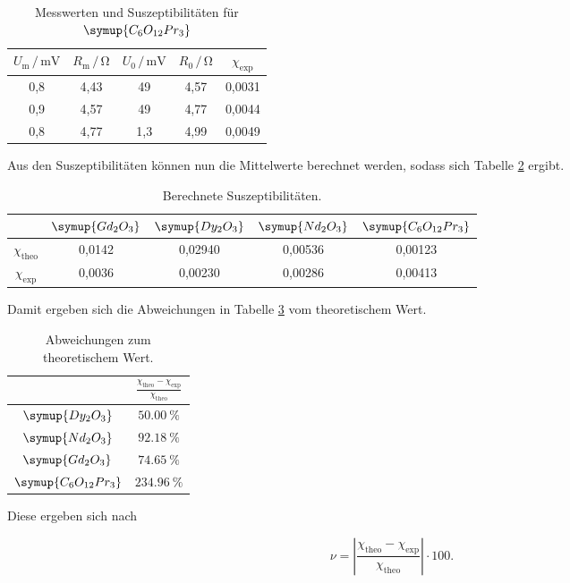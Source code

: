 \begin{table}
\centering
\caption{Messwerten und Suszeptibilitäten für $\symup{C_6O_{12}Pr_3}$}
\label{tab:Messdaten6}
\begin{tabular}{c c c c c}
\toprule
$U_\text{m} \,/\, \si{\milli\volt}$ & $R_\text{m} \,/\, \si{\ohm}$ & $U_\text{0} \,/\, \si{\milli\volt}$& $R_\text{0} \,/\, \si{\ohm}$ & $\chi _\text{exp}$ \\
\midrule
0,8 & 4,43 &  49 & 4,57 & 0,0031\\
0,9 & 4,57 &  49 & 4,77 & 0,0044\\
0,8 & 4,77 & 1,3 & 4,99 & 0,0049\\
\bottomrule
\end{tabular}
\end{table}

Aus den Suszeptibilitäten können nun die Mittelwerte berechnet werden, 
sodass sich Tabelle \ref{tab:Messdaten7} ergibt. 

\begin{table}
\centering
\caption{Berechnete Suszeptibilitäten.}
\label{tab:Messdaten7}
\begin{tabular}{c c c c c}
\toprule
& $\symup{Gd_2O_3}$ & $\symup{Dy_2O_3}$ & $\symup{Nd_2O_3}$ & $\symup{C_6O_{12}Pr_3}$\\
\midrule
$\chi_\text{theo}$ & 0,0142 & 0,02940 & 0,00536 & 0,00123\\
$\chi_\text{exp}$  & 0,0036 & 0,00230 & 0,00286 & 0,00413\\
\bottomrule
\end{tabular}
\end{table}

Damit ergeben sich die Abweichungen in Tabelle \ref{tab:Messdaten8} vom theoretischem 
Wert. 

\begin{table}
\centering
\caption{Abweichungen zum theoretischem Wert.}
\label{tab:Messdaten8}
\begin{tabular}{c c}
\toprule
& $\frac{\chi_\text{theo}-\chi_\text{exp}}{\chi_\text{theo}}$\\ 
\midrule
$\symup{Dy_2O_3}$       &  $\SI{50.00}{\percent}$\\
$\symup{Nd_2O_3}$       &  $\SI{92.18}{\percent}$\\
$\symup{Gd_2O_3}$       &  $\SI{74.65}{\percent}$\\
$\symup{C_6O_{12}Pr_3}$ & $\SI{234.96}{\percent}$\\
\bottomrule
\end{tabular}
\end{table}

Diese ergeben sich nach 

\begin{equation*}
\nu = \left|\frac{\chi_\text{theo}-\chi_\text{exp}}{\chi_\text{theo}}\right| \cdot 100.
\end{equation*}
